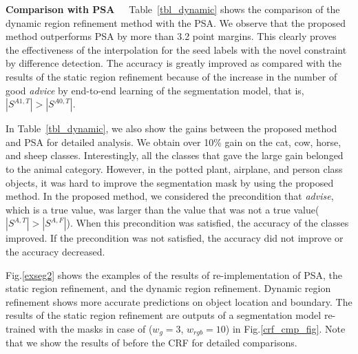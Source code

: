\documentclass[10pt,twocolumn,letterpaper]{article}
\begin{document}
\noindent
{\bf Comparison with PSA~~}
Table~\ref{tbl_dynamic} shows the comparison of the dynamic region refinement method with the PSA.
We observe that the proposed method outperforms PSA by more than 3.2 point margins.
This clearly proves the effectiveness of the interpolation for the seed labels with the novel constraint by difference detection.
The accuracy is greatly improved as compared with the results of the static region refinement because of the increase in the number of good {\it advice} by end-to-end learning of the segmentation model, that is, $| S^{A1,T}| > | S^{A0, T}|  $.

In Table~\ref{tbl_dynamic}, we also show the gains between the proposed method and PSA for detailed analysis.
We obtain over 10\% gain on the cat, cow, horse, and sheep classes.
Interestingly, all the classes that gave the large gain belonged to the animal category.
However, in the potted plant, airplane, and person class objects, it was hard to improve the segmentation mask by using the proposed method.
In the proposed method, we considered the precondition that {\it advise}, which is a true value, was larger than the value that was not a true value($ | S ^ {A, T} | > | S ^ {A, F}| $).
When this precondition was satisfied, the accuracy of the classes improved.
If the precondition was not satisfied, the accuracy did not improve or the accuracy decreased.

Fig.\ref{exseg2} shows the examples of the results of re-implementation of PSA, the static region refinement, and the dynamic region refinement.
Dynamic region refinement shows more accurate predictions on object location and
boundary.
The results of the static region refinement are outputs of a segmentation model re-trained with the masks in case of ($w_{g}=3$, $w_{rgb}=10$) in Fig.\ref{crf_cmp_fig}.
Note that we show the results of before the CRF for detailed comparisons.
\end{document}
